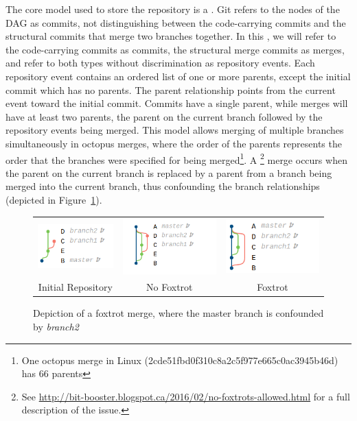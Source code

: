 The core model used to store the repository is a . Git refers to the nodes of the DAG as commits,
not distinguishing between the code-carrying commits and the structural
commits that merge two branches together. In this \paper{}, we will
refer to the code-carrying commits as commits, the structural merge
commits as merges, and refer to both types without discrimination as
repository events. Each repository event contains an ordered list of one
or more parents, except the initial commit which has no parents. The
parent relationship points from the current event toward the initial
commit. Commits have a single parent, while merges will have at least
two parents, the parent on the current branch followed by the repository
events being merged. This model allows merging of multiple branches
simultaneously in octopus merges, where the order of the parents
represents the order that the branches were specified for being
merged\footnote{One octopus merge in Linux
  (2cde51fbd0f310c8a2c5f977e665c0ac3945b46d) has 66 parents}.
A \foxtrot\footnote{See
  \url{http://bit-booster.blogspot.ca/2016/02/no-foxtrots-allowed.html}
  for a full description of the issue.} merge occurs when the parent on
the current branch is replaced by a parent from a branch being merged
into the current branch, thus confounding the branch relationships
(depicted in Figure~\ref{fig:foxtrot_steps}).

\begin{figure}[htpb]
  \centering
  \begin{tabular}{ccc}
    \includegraphics[width=114px]{Figures/background/foxtrot_initial.png} &
    \includegraphics[width=145px]{Figures/background/foxtrot_good.png} &
    \includegraphics[width=145px]{Figures/background/foxtrot_bad.png} \\
    Initial Repository & No Foxtrot & Foxtrot
  \end{tabular}
  \caption{Depiction of a foxtrot merge, where the master branch is
    confounded by \emph{branch2}}
  \label{fig:foxtrot_steps}
\end{figure}

